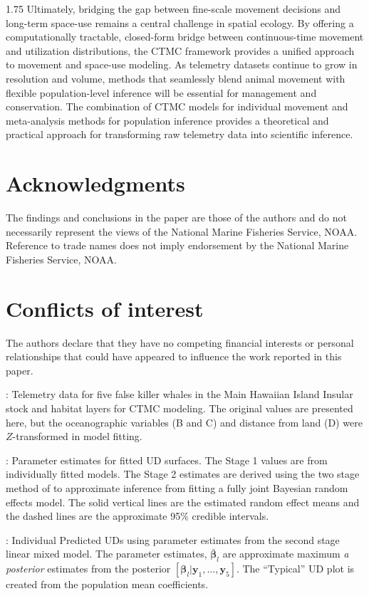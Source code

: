 \documentclass[12pt]{article}
\newcommand{\by}{\ensuremath{\mathbf{y}}}
\newcommand{\bb}{\ensuremath{\boldsymbol{\beta}}}
\begin{document}
\begin{spacing}{1.75}
Ultimately, bridging the gap between fine-scale movement decisions and long-term space-use remains a central challenge in spatial ecology. By offering a computationally tractable, closed-form bridge between continuous-time movement and utilization distributions, the CTMC framework provides a unified approach to movement and space-use modeling. As telemetry datasets continue to grow in resolution and volume, methods that seamlessly blend animal movement with flexible population-level inference will be essential for management and conservation. The combination of CTMC models for individual movement and meta-analysis methods for population inference provides a theoretical and practical approach for transforming raw telemetry data into scientific inference.    
 
\section*{Acknowledgments}

The findings and conclusions in the paper are those of the authors and do not necessarily represent the views of the National Marine Fisheries Service, NOAA. Reference to trade names does not imply endorsement by the National Marine Fisheries Service, NOAA.

\section*{Conflicts of interest}
The authors declare that they have no competing financial interests or personal relationships that could have appeared to influence the work reported in this paper.




\clearpage


: Telemetry data for five false killer whales in the Main Hawaiian Island Insular stock and habitat layers for CTMC modeling. The original values are presented here, but the oceanographic variables (B and C) and distance from land (D) were $Z$-transformed in model fitting.  
\bigskip

: Parameter estimates for fitted UD surfaces. The Stage 1 values are from individually fitted models. The Stage 2 estimates are derived using the two stage method of \cite{johnson2022greater} to approximate inference from fitting a fully joint Bayesian random effects model. The solid vertical lines are the estimated random effect means and the dashed lines are the approximate 95\%  credible intervals.
\bigskip

: Individual Predicted UDs using parameter estimates from the second stage linear mixed model. The parameter estimates, $\bar{\bb}_l$ are approximate maximum {\it a posterior} estimates from the posterior $[\bb_l|\by_1,\dots,\by_5]$. The ``Typical'' UD plot is created from the population mean coefficients. 
\bigskip

\end{spacing}
\end{document}
